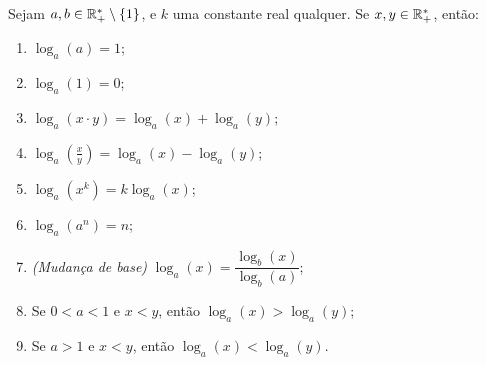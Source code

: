 \begin{prop}
    Sejam $a, b \in \mathbb{R}_{+}^{*} \setminus \{1\}$, e $k$ uma constante real qualquer. Se $x, y \in \mathbb{R}_{+}^{*}$, então:

  \begin{enumerate}
  \item $\log_{a}(a)= 1$;
  \item $\log_{a}(1)= 0$;
   \item $\log_{a}(x \cdot y)=\log_{a}(x) + \log_{a}(y)$;
   \item $\log_{a} \left(\frac{x}{y}\right)=\log_{a}(x) - \log_{a}(y)$;
   \item $\log_{a}(x^{k})= k \log_{a}(x)$;
   \item $\log_{a}(a^n)= n$;
   \item \textit{(Mudança de base)} $\log_{a}(x)=\dfrac{\log_{b}(x)}{\log_{b}(a)}$;
   \item Se $0 < a < 1$ e $x < y$, então $\log_{a}(x) > \log_{a}(y)$;
   \item Se $a> 1$ e $x < y$, então $\log_{a}(x) < \log_{a}(y)$.
  \end{enumerate}
  \end{prop}
